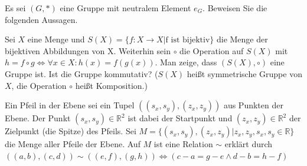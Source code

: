 \documentclass[10pt, a4paper]{exam}
\begin{document}
\begin{questions}

    \question Es sei $(G, \ast)$ eine Gruppe mit neutralem Element $e_G$. Beweisen Sie die folgenden Aussagen.

    \question Sei $X$ eine Menge und $S(X)=\{f: X\rightarrow X | \text{f ist bijektiv}\}$ die Menge der bijektiven Abbildungen von X. Weiterhin sein $\circ$ die Operation auf $S(X)$ mit $h=f\circ g \Leftrightarrow\forall x\in X: h(x) = f(g(x))$.
    Man zeige, dass $(S(X),\circ)$ eine Gruppe ist. Ist die Gruppe kommutativ? ($S(X)$ heißt
    symmetrische Gruppe von $X$, die Operation $\circ$ heißt Komposition.)

    \question Ein Pfeil in der Ebene sei ein Tupel $((s_x,s_y),(z_x,z_y))$ aus Punkten der Ebene. Der Punkt $(s_x,s_y)\in\mathbb{R}^2$ ist dabei der Startpunkt und $(z_x,z_y)\in\mathbb{R}^2$  der Zielpunkt (die Spitze) des Pfeils. Sei $M=\{(s_x,s_y),(z_x,z_y)|z_x,z_y,s_x,s_y\in\mathbb{R}\}$ die Menge aller Pfeile der Ebene. Auf $M$ ist eine Relation $\sim$ erklärt durch $((a, b), (c, d)) \sim ((e, f ), (g, h))\Leftrightarrow (c - a = g - e \wedge d - b = h - f )$
\end{questions}
\end{document}

